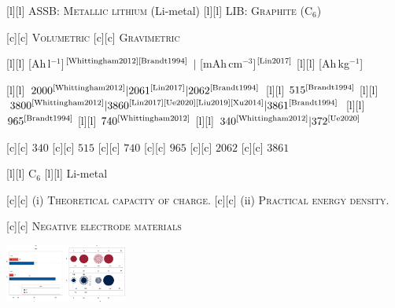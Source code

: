 [l][l] {\tiny ASSB: \textsc{Metallic lithium} (Li-metal)}
[l][l] {\tiny LIB: \textsc{Graphite} (C$_{6}$)}

[c][c] {\tiny \textsc{Volumetric}}
[c][c] {\tiny \textsc{Gravimetric}}

[l][l] {\tiny [Ah\,l$^{-1}$]$^{\text{\cite{Whittingham2012}\cite{Brandt1994}}}$ $|$ [mAh\,cm$^{-3}$]$^{\text{\cite{Lin2017}}}$}
[l][l] {\tiny [Ah\,kg$^{-1}$]}

[l][l] {\tiny $2000^{\text{\cite{Whittingham2012}}} | 2061^{\text{\cite{Lin2017}}} | 2062^{\text{\cite{Brandt1994}}}$}
[l][l] {\tiny $515^{\text{\cite{Brandt1994}}}$}
[l][l] {\tiny $3800^{\text{\cite{Whittingham2012}}} | 3860^{\text{\cite{Lin2017}\cite{Ue2020}\cite{Liu2019}\cite{Xu2014}}} | 3861^{\text{\cite{Brandt1994}}}$}
[l][l] {\tiny $965^{\text{\cite{Brandt1994}}}$}
[l][l] {\tiny $740^{\text{\cite{Whittingham2012}}}$}
[l][l] {\tiny $340^{\text{\cite{Whittingham2012}}} | 372^{\text{\cite{Ue2020}}}$}

[c][c] {\tiny $340$}
[c][c] {\tiny $515$}
[c][c] {\tiny $740$}
[c][c] {\tiny $965$}
[c][c] {\tiny $2062$}
[c][c] {\tiny $3861$}

[l][l] {\tiny C$_{6}$}
[l][l] {\tiny \color{black} Li-metal \color{black}}

[c][c]  {\scriptsize (i) \textsc{Theoretical capacity of charge.}}
[c][c] {\scriptsize (ii) \textsc{Practical energy density.}}

[c][c] {\tiny \textsc{Negative electrode materials}}

\includegraphics[width=0.3\textwidth]{energydensity.eps}